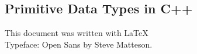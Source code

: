 \documentclass[xcolor=dvipsnames]{article}
\begin{document}
\newpage

\begin{appendix}

\section{Primitive Data Types in C++}\label{c++_data_types}



\end{appendix}

\newpage

\printnoidxglossaries




\vfill
\begin{center}
This document was written with \LaTeX 
\\Typeface: Open Sans by Steve Matteson.
\end{center}

\end{document}
